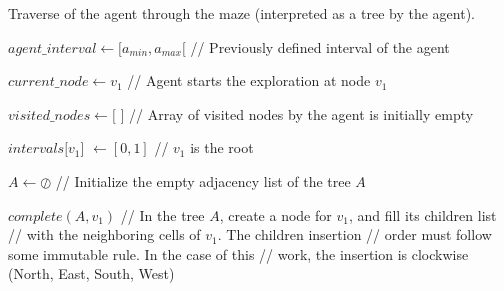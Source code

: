 \begin{algorithm}
\caption{Traverse of the agent through the maze (interpreted as a tree by the agent).}
\label{pseudocode_1}
\begin{algorithmic}

\State $agent\_interval \gets [a_{min},a_{max}[$ \hspace{0.5cm} \slash\slash \hspace{0.1cm} Previously defined interval of the agent

\State $current\_node \gets v_{1}$ \hspace{1cm} \slash\slash \hspace{0.1cm} Agent starts the exploration at node $v_{1}$

\State $visited\_nodes \gets [$ $]$ \hspace{0.95cm} \slash\slash \hspace{0.1cm} Array of visited nodes by the agent is initially empty

\State $intervals[v_{1}$] $\gets [0,1]$ \hspace{0.65cm} \slash\slash \hspace{0.1cm} $v_{1}$ is the root


\State $A \gets \oslash$ \hspace{3.1cm} \slash\slash \hspace{0.1cm} Initialize the empty adjacency list of the tree $A$

\State $complete(A, v_{1})$ \hspace{1.55cm} \slash\slash \hspace{0.1cm} In the tree $A$, create a node for $v_{1}$, and fill its children list
\State \hspace{4.45cm} \slash\slash \hspace{0.1cm} with the neighboring cells of $v_{1}$. The children insertion
\State \hspace{4.45cm} \slash\slash \hspace{0.1cm} order must follow some immutable rule. In the case of this
\State \hspace{4.45cm} \slash\slash \hspace{0.1cm} work, the insertion is clockwise (North, East, South, West)\\


\end{algorithmic}
\end{algorithm}
